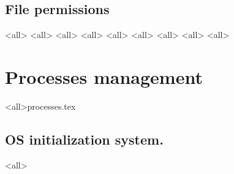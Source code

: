 \subsection{File permissions}
\mode<all>{}
\mode<all>{}
\mode<all>{}
\mode<all>{}
\mode<all>{}
\mode<all>{}
\mode<all>{}
\mode<all>{}
\mode<all>{}
\section{Processes management}
\mode<all>{{processes.tex}}
\subsection{OS initialization system.}
\mode<all>{}





